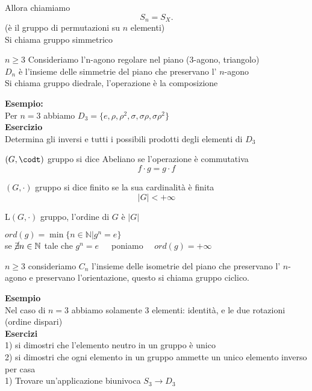 \documentclass[12px]{article}
\begin{document}
Allora chiamiamo 
 \[
S_n = S_X
.\] 
(è il gruppo di permutazioni su $n$ elementi)\\
Si chiama gruppo simmetrico
\begin{defi}
	$n\geq 3$ Consideriamo l'n-agono regolare nel piano (3-agono, triangolo)\\
	 $D_n$ è l'insieme delle simmetrie del piano che preservano l' $n$-agono\\
	 Si chiama gruppo diedrale, l'operazione è la composizione
\end{defi}
\textbf{Esempio:}\\
Per $n=3$ abbiamo  $D_3 = \{e, \rho, \rho^2, \sigma, \sigma\rho, \sigma\rho^2\}$\\
\textbf{Esercizio}\\
Determina gli inversi e tutti i possibili prodotti degli elementi di $D_3$
\begin{defi}
	$(G,\codt)$ gruppo si dice Abeliano se l'operazione è commutativa \[f\cdot g = g\cdot f\]
\end{defi}
\begin{defi}
	$(G,\cdot)$ gruppo si dice finito se la sua cardinalità è finita \[|G| < +\infty\]
\end{defi}
\begin{defi}
	L$(G,\cdot)$ gruppo, l'ordine di $G$ è $|G|$
\end{defi}
\begin{defi}
	$ord(g) = \min \lbrace n\in \mathbb N | g^n = e\rbrace$\\
		se $\cancel\exists n\in \mathbb N$  tale che $ g^n = e$\ \ \  poniamo  \ \ $ord(g) = +\infty$
\end{defi}
\begin{defi}
	$n\geq 3$ consideriamo  $C_n$ l'insieme delle isometrie del piano che preservano l' $n$-agono e preservano l'orientazione, questo si chiama gruppo ciclico.
\end{defi}
\textbf{Esempio}\\
Nel caso di $n = 3$ abbiamo solamente 3 elementi: identità, e le due rotazioni (ordine dispari)\\
\textbf{Esercizi}\\
1) si dimostri che l'elemento neutro in un gruppo è unico\\
2) si dimostri che ogni elemento in un gruppo ammette un unico elemento inverso\\
per casa\\
1) Trovare un'applicazione biunivoca $S_3 \rightarrow D_3$\\
\end{document}
